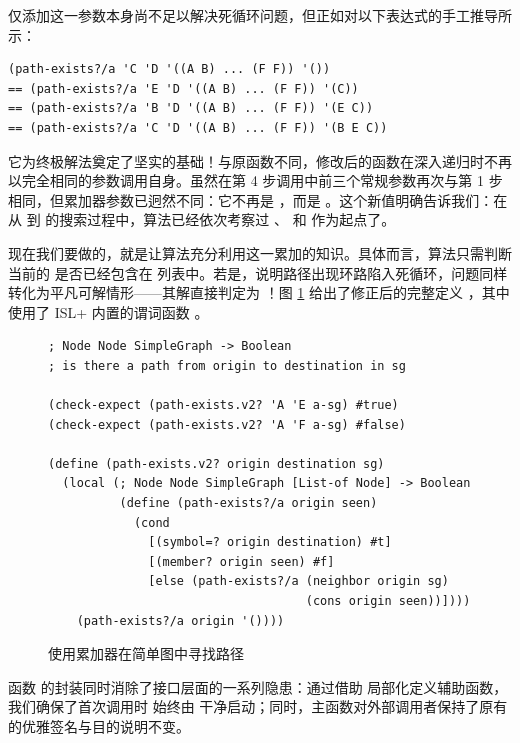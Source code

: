 仅添加这一参数本身尚不足以解决死循环问题，但正如对以下表达式的手工推导所示：

\begin{lstlisting}[language=BSL]
   (path-exists?/a 'C 'D '((A B) ... (F F)) '())
== (path-exists?/a 'E 'D '((A B) ... (F F)) '(C))
== (path-exists?/a 'B 'D '((A B) ... (F F)) '(E C))
== (path-exists?/a 'C 'D '((A B) ... (F F)) '(B E C))
\end{lstlisting}

它为终极解法奠定了坚实的基础！与原函数不同，修改后的函数在深入递归时不再以完全相同的参数调用自身。虽然在第 4 步调用中前三个常规参数再次与第 1 步相同，但累加器参数已迥然不同：它不再是 \code{\textquotesingle()}，而是 。这个新值明确告诉我们：在从  到  的搜索过程中，算法已经依次考察过 、 和  作为起点了。

现在我们要做的，就是让算法充分利用这一累加的知识。具体而言，算法只需判断当前的  是否已经包含在  列表中。若是，说明路径出现环路陷入死循环，问题同样转化为平凡可解情形——其解直接判定为 ！图 \ref{fig:181} 给出了修正后的完整定义 ，其中使用了 ISL+ 内置的谓词函数 。

\begin{figure}[htbp]
  \centering
\begin{lstlisting}[language=BSL, basicstyle=\scriptsize\ttfamily]
; Node Node SimpleGraph -> Boolean
; is there a path from origin to destination in sg

(check-expect (path-exists.v2? 'A 'E a-sg) #true)
(check-expect (path-exists.v2? 'A 'F a-sg) #false)

(define (path-exists.v2? origin destination sg)
  (local (; Node Node SimpleGraph [List-of Node] -> Boolean
          (define (path-exists?/a origin seen)
            (cond
              [(symbol=? origin destination) #t]
              [(member? origin seen) #f]
              [else (path-exists?/a (neighbor origin sg)
                                    (cons origin seen))])))
    (path-exists?/a origin '())))
\end{lstlisting}
  \caption{使用累加器在简单图中寻找路径}
  \label{fig:181}
\end{figure}

函数  的封装同时消除了接口层面的一系列隐患：通过借助  局部化定义辅助函数，我们确保了首次调用时  始终由 \code{\textquotesingle()} 干净启动；同时，主函数对外部调用者保持了原有的优雅签名与目的说明不变。

